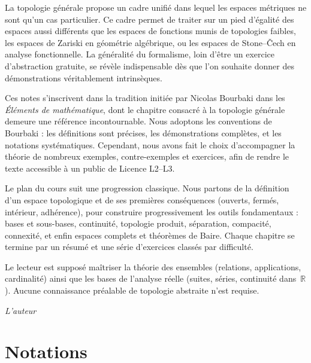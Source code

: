 \documentclass[12pt,a4paper,openany]{book}
\theoremstyle{definition}
\theoremstyle{cours}
\theoremstyle{coursnormal}
\newcommand{\R}{\mathbb{R}}
\begin{document}
\medskip

La topologie générale propose un cadre unifié dans lequel les espaces métriques ne sont qu'un cas particulier. Ce cadre permet de traiter sur un pied d'égalité des espaces aussi différents que les espaces de fonctions munis de topologies faibles, les espaces de Zariski en géométrie algébrique, ou les espaces de Stone--Čech en analyse fonctionnelle. La généralité du formalisme, loin d'être un exercice d'abstraction gratuite, se révèle indispensable dès que l'on souhaite donner des démonstrations véritablement intrinsèques.

\medskip

Ces notes s'inscrivent dans la tradition initiée par Nicolas Bourbaki dans les \emph{Éléments de mathématique}, dont le chapitre consacré à la topologie générale demeure une référence incontournable. Nous adoptons les conventions de Bourbaki : les définitions sont précises, les démonstrations complètes, et les notations systématiques. Cependant, nous avons fait le choix d'accompagner la théorie de nombreux exemples, contre-exemples et exercices, afin de rendre le texte accessible à un public de Licence L2--L3.

\medskip

Le plan du cours suit une progression classique. Nous partons de la définition d'un espace topologique et de ses premières conséquences (ouverts, fermés, intérieur, adhérence), pour construire progressivement les outils fondamentaux : bases et sous-bases, continuité, topologie produit, séparation, compacité, connexité, et enfin espaces complets et théorèmes de Baire. Chaque chapitre se termine par un résumé et une série d'exercices classés par difficulté.

\medskip

Le lecteur est supposé maîtriser la théorie des ensembles (relations, applications, cardinalité) ainsi que les bases de l'analyse réelle (suites, séries, continuité dans~$\R$). Aucune connaissance préalable de topologie abstraite n'est requise.

\vfill

\hfill\textit{L'auteur}

\chapter*{Notations}
\end{document}
